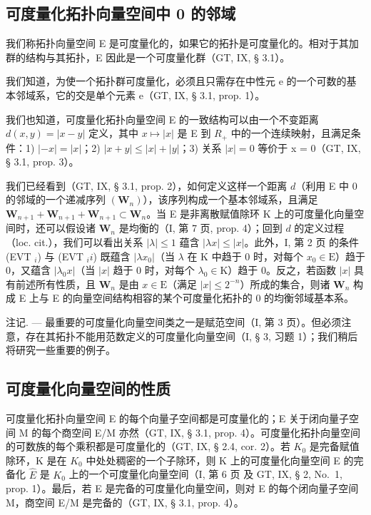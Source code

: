 \subsection{可度量化拓扑向量空间中 0 的邻域}

我们称拓扑向量空间 E 是可度量化的，如果它的拓扑是可度量化的。相对于其加群的结构与其拓扑，E 因此是一个可度量化群（GT, IX, § 3.1）。

我们知道，为使一个拓扑群可度量化，必须且只需存在中性元 e 的一个可数的基本邻域系，它的交是单个元素 e（GT, IX, § 3.1, prop. 1）。

我们也知道，可度量化拓扑向量空间 E 的一致结构可以由一个不变距离 \(d(x, y) = |x - y|\) 定义，其中 \(x \mapsto |x|\) 是 E 到 \(R_{+}\) 中的一个连续映射，且满足条件：1) \(|-x| = |x|\)；2) \(|x + y| \leqslant |x| + |y|\)；3) 关系 \(|x| = 0\) 等价于 x = 0（GT, IX, § 3.1, prop. 3）。

我们已经看到（GT, IX, § 3.1, prop. 2），如何定义这样一个距离 \(d\)（利用 E 中 0 的邻域的一个递减序列 \((\mathbf{W}_n)\)），该序列构成一个基本邻域系，且满足 \(\mathbf{W}_{n+1} + \mathbf{W}_{n+1} + \mathbf{W}_{n+1} \subset \mathbf{W}_n\)。当 E 是非离散赋值除环 K 上的可度量化向量空间时，还可以假设诸 \(\mathbf{W}_n\) 是均衡的（I, 第 7 页, prop. 4）；回到 \(d\) 的定义过程（loc. cit.），我们可以看出关系 \(|\lambda| \leqslant 1\) 蕴含 \(|\lambda x| \leqslant |x|\)。此外，I, 第 2 页 的条件 (EVT \(_i\)) 与 (EVT \(_ii\)) 既蕴含 \(|\lambda x_0|\)（当 \(\lambda\) 在 K 中趋于 0 时，对每个 \(x_0 \in \mathrm{E}\)）趋于 0，又蕴含 \(|\lambda_0 x|\)（当 \(|x|\) 趋于 0 时，对每个 \(\lambda_0 \in \mathrm{K}\)）趋于 0。反之，若函数 \(|x|\) 具有前述所有性质，且 \(\mathbf{W}_n\) 是由 \(x \in \mathrm{E}\)（满足 \(|x| \leqslant 2^{-n}\)）所成的集合，则诸 \(\mathbf{W}_n\) 构成 E 上与 E 的向量空间结构相容的某个可度量化拓扑的 0 的均衡邻域基本系。

注记. --- 最重要的可度量化向量空间类之一是赋范空间（I, 第 3 页）。但必须注意，存在其拓扑不能用范数定义的可度量化向量空间（I, § 3, 习题 1）；我们稍后将研究一些重要的例子。

\subsection{可度量化向量空间的性质}

可度量化拓扑向量空间 E 的每个向量子空间都是可度量化的；E 关于闭向量子空间 M 的每个商空间 E/M 亦然（GT, IX, § 3.1, prop. 4）。可度量化拓扑向量空间的可数族的每个乘积都是可度量化的（GT, IX, § 2.4, cor. 2）。若 \(K_{0}\) 是完备赋值除环，K 是在 \(K_{0}\) 中处处稠密的一个子除环，则 K 上的可度量化向量空间 E 的完备化 \(\hat{E}\) 是 \(K_{0}\) 上的一个可度量化向量空间（I, 第 6 页 及 GT, IX, § 2, No.~1, prop. 1）。最后，若 E 是完备的可度量化向量空间，则对 E 的每个闭向量子空间 M，商空间 E/M 是完备的（GT, IX, § 3.1, prop. 4）。

